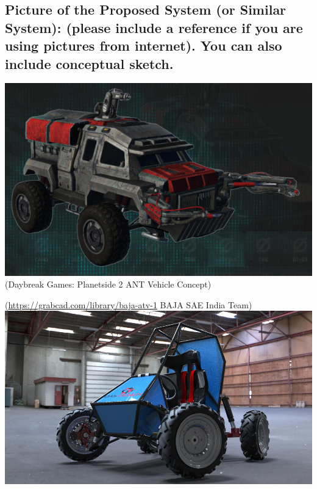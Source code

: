 \subsection{Picture of  the Proposed System (or Similar System): (please include a reference if you are using pictures from internet). You can also include conceptual sketch.}
\includegraphics{c-1-Images/Planetside.png}
(Daybreak Games: Planetside 2 ANT Vehicle Concept)

(\url{https://grabcad.com/library/baja-atv-1} BAJA SAE India Team)
\includegraphics{c-1-Images/BAJA.jpeg}
